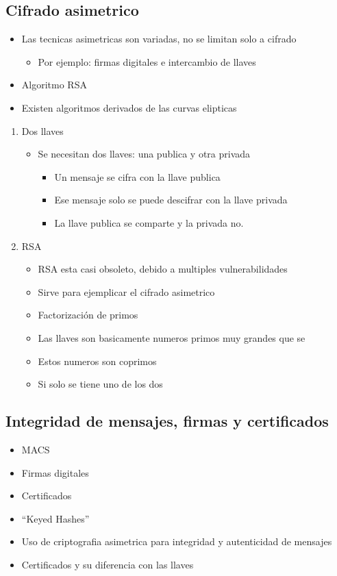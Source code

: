 \documentclass[11pt]{article}
\begin{document}
\subsection{Cifrado asimetrico}
\label{sec:orgce4b5db}
\begin{itemize}
\item Las tecnicas asimetricas son variadas, no se limitan solo a cifrado
\begin{itemize}
\item Por ejemplo: firmas digitales e intercambio de llaves
\end{itemize}
\item Algoritmo RSA
\item Existen algoritmos derivados de las curvas elipticas
\end{itemize}
\begin{enumerate}
\item Dos llaves
\label{sec:orgf5dd081}
\begin{itemize}
\item Se necesitan dos llaves: una publica y otra privada
\begin{itemize}
\item Un mensaje se cifra con la llave publica
\item Ese mensaje solo se puede descifrar con la llave privada
\item La llave publica se comparte y la privada no.
\end{itemize}
\end{itemize}
\item RSA
\label{sec:org3d84b80}
\begin{itemize}
\item RSA esta casi obsoleto, debido a multiples vulnerabilidades
\item Sirve para ejemplicar el cifrado asimetrico

\item Factorización de primos

\item Las llaves son basicamente numeros primos muy grandes que se
\item Estos numeros son coprimos

\item Si solo se tiene uno de los dos
\end{itemize}
\end{enumerate}
\subsection{Integridad de mensajes, firmas y certificados}
\label{sec:orgd15d69e}
\begin{itemize}
\item MACS
\item Firmas digitales
\item Certificados

\item ``Keyed Hashes''
\item Uso de criptografia asimetrica para integridad y autenticidad de mensajes
\item Certificados y su diferencia con las llaves
\end{itemize}
\end{document}

